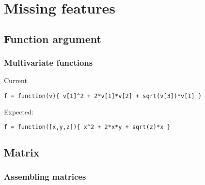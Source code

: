 
\chapter{Missing features}
\label{chap:missing-features}

\section{Function argument}
\label{sec:function-argument}


\subsection{Multivariate functions}
\label{sec:mult-funct}

Current
\begin{lstlisting}
f = function(v){ v[1]^2 + 2*v[1]*v[2] + sqrt(v[3])*v[1] }
\end{lstlisting}
Expected:
\begin{lstlisting}
f = function([x,y,z]){ x^2 + 2*x*y + sqrt(z)*x }
\end{lstlisting}

\section{Matrix}
\label{sec:matrix-1}

\subsection{Assembling matrices}
\label{sec:assembling-matrices}

